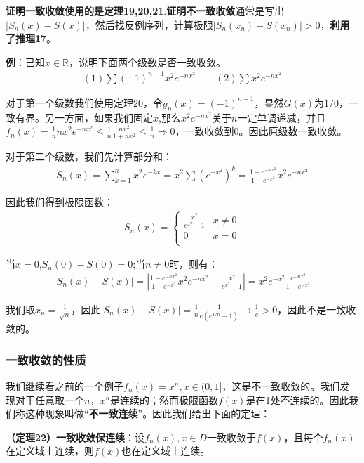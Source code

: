 \documentclass{ctexart}
\let\oldtextbf\textbf
\renewcommand{\textbf}[1]{\textcolor{brown!50!red}{\oldtextbf{#1}}}
\begin{document}
\textbf{\color{brown!50!red}证明一致收敛使用的是定理19,20,21}.\textbf{\color{brown!50!red}证明不一致收敛}通常是写出$|S_n(x)-S(x)|$，然后找反例序列，计算极限$|S_n(x_n)-S(x_n)|>0$，\textbf{\color{brown!50!red}利用了推理17}。

\textbf{\color{brown!50!red}例}：已知$x\in \mathbb{R}$，说明下面两个级数是否一致收敛。
\begin{align*}
    (1)\sum (-1)^{n-1}x^2e^{-nx^2}\qquad
    (2)\sum x^2e^{-nx^2}
\end{align*}

对于第一个级数我们使用定理20，令$g_n(x)=(-1)^{n-1}$，显然$G(x)$为$1/0$，一致有界。另一方面，如果我们固定$x$,那么$x^2e^{-nx^2}$关于$n$一定单调递减，并且$f_n(x)=\frac{1}{n}nx^2e^{-nx^2}\leq \frac{1}{n}\frac{nx^2}{1+nx^2}\leq \frac{1}{n}\Longrightarrow 0$，一致收敛到0。因此原级数一致收敛。

对于第二个级数，我们先计算部分和：
\begin{align*}
    S_n(x)=\sum_{k=1}^n x^2e^{-kx}=x^2\sum (e^{-x^2})^k=\frac{1-e^{-nx^2}}{1-e^{-x^2}}x^2e^{-nx^2}
 \end{align*}

 因此我们得到极限函数：
 \begin{align*}
     S_n(x)=\begin{cases}
         \frac{x^2}{e^{x^2}-1}&x\neq 0\\
         0&x=0\\
     \end{cases}
 \end{align*}

 当$x=0$,$S_n(0)-S(0)=0$;当$n\neq 0$时，则有：
 \begin{align*}
     |S_n(x)-S(x)|=|\frac{1-e^{-nx^2}}{1-e^{-x^2}}x^2e^{-nx^2}-\frac{x^2}{e^{x^2}-1}|=x^2e^{-x^2}\frac{e^{-nx^2}}{1-e^{-x^2}}
 \end{align*}

 我们取$x_n=\frac{1}{\sqrt{n}}$，因此$|S_n(x)-S(x)|=\frac{1}{n}\frac{1}{e(e^{1/n}-1)}\to \frac{1}{e}>0$，因此不是一致收敛的。

 \subsubsection{一致收敛的性质}
 我们继续看之前的一个例子$f_n(x)=x^n,x\in(0,1]$，这是不一致收敛的。我们发现对于任意取一个$n$，$x^n$是连续的；然而极限函数$f(x)$是在1处不连续的。因此我们称这种现象叫做“\textbf{\color{brown!50!red}不一致连续}”。因此我们给出下面的定理：
 \begin{tcolorbox}[
    colback=bac2,     %
    colframe=fra2,   %
    coltitle=white,             %
    coltext=tex2,
    title=一致收敛保连续,
    fonttitle=\bfseries,        %
arc=3mm,                     %
breakable
]
\textbf{\color{brown!50!red}（定理22）一致收敛保连续}：设$f_n(x),x\in D$一致收敛于$f(x)$，且每个$f_n(x)$在定义域上连续，则$f(x)$也在定义域上连续。
\end{tcolorbox}
\end{document}
